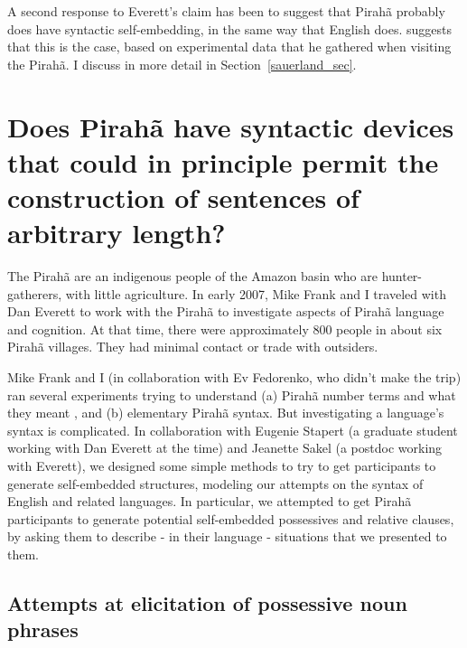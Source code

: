 \documentclass{article}
\begin{document}
A second response to Everett’s claim has been to suggest that Pirahã probably does have syntactic self-embedding, in the same way that English does. \cite{sauerland2018false} suggests that this is the case, based on experimental data that he gathered when visiting the Pirahã. I discuss in more detail in Section~\ref{sauerland_sec}.

\section{Does Pirahã have  syntactic devices that could in principle permit the construction of sentences of arbitrary length?}

The Pirahã are an indigenous people of the Amazon basin who are hunter\hyp gatherers, with little agriculture.  In early 2007, Mike Frank and I traveled with Dan Everett to work with the Pirahã to investigate aspects of Pirahã language and cognition. At that time, there were approximately 800 people in about six Pirahã villages. They had minimal contact or trade with outsiders. 

Mike Frank and I (in collaboration with Ev Fedorenko, who didn’t make the trip) ran several experiments trying to understand (a) Pirahã number terms and what they meant \citep{frank2008language}, and (b) elementary Pirahã syntax. But investigating a language’s syntax is complicated.  In collaboration with Eugenie Stapert (a graduate student working with Dan Everett at the time) and Jeanette Sakel (a postdoc working with Everett), we designed some simple methods to try to get participants to generate self-embedded structures, modeling our attempts on the syntax of English and related languages. In particular, we attempted to get Pirahã participants to generate potential self-embedded possessives and relative clauses, by asking them to describe - in their language - situations that we presented to them.

\subsection{Attempts at elicitation of possessive noun phrases}
\end{document}

